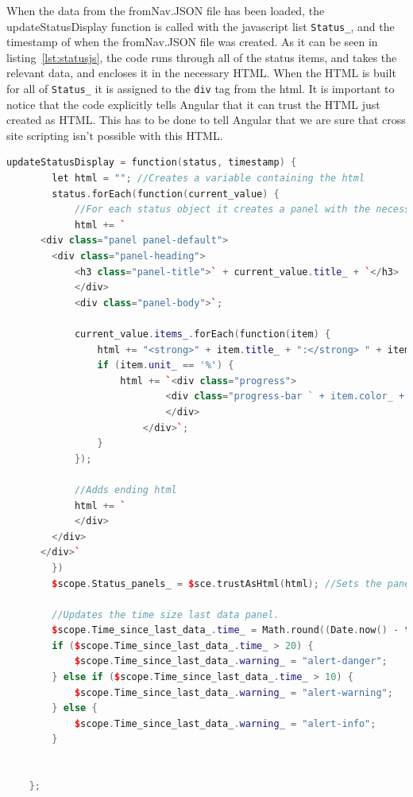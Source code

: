 When the data from the fromNav.JSON file has been loaded, the updateStatusDisplay function is called with the javascript list \texttt{Status_}, and the timestamp of when the fromNav.JSON file was created. As it can be seen in listing~\ref{lst:statusjs}, the code runs through all of the status items, and takes the relevant data, and encloses it in the necessary HTML. When the HTML is built for all of \texttt{Status_} it is assigned to the \texttt{div} tag from the html. It is important to notice that the code explicitly tells Angular that it can trust the HTML just created as HTML. This has to be done to tell Angular that we are sure that cross site scripting isn't possible with this HTML. 

\begin{lstlisting}[caption = {displaying status messages }, captionpos=b, label={lst:statusjs}, language=C++,firstnumber=1]
updateStatusDisplay = function(status, timestamp) {
        let html = ""; //Creates a variable containing the html
        status.forEach(function(current_value) {
			//For each status object it creates a panel with the necessary data
            html += `
      <div class="panel panel-default">
      	<div class="panel-heading">
      		<h3 class="panel-title">` + current_value.title_ + `</h3>
      		</div>
      		<div class="panel-body">`;

            current_value.items_.forEach(function(item) {
                html += "<strong>" + item.title_ + ":</strong> " + item.data_ + " " + item.unit_ + "<br />"
                if (item.unit_ == '%') {
                    html += `<div class="progress">
                  			<div class="progress-bar ` + item.color_ + `  " role="progressbar" aria-valuenow="0" aria-valuemin="0" aria-valuemax="100" style="width: ` + item.data_ + `%">
                  			</div>
                  		</div>`;
                }
            });

			//Adds ending html
            html += `
      		</div>
      	</div>
      </div>`
        })
        $scope.Status_panels_ = $sce.trustAsHtml(html); //Sets the panels to the html created and trusts it, maybe not good for security

		//Updates the time size last data panel.
        $scope.Time_since_last_data_.time_ = Math.round((Date.now() - timestamp) / 1000);
        if ($scope.Time_since_last_data_.time_ > 20) {
            $scope.Time_since_last_data_.warning_ = "alert-danger";
        } else if ($scope.Time_since_last_data_.time_ > 10) {
            $scope.Time_since_last_data_.warning_ = "alert-warning";
        } else {
            $scope.Time_since_last_data_.warning_ = "alert-info";
        }


    };
\end{lstlisting}

